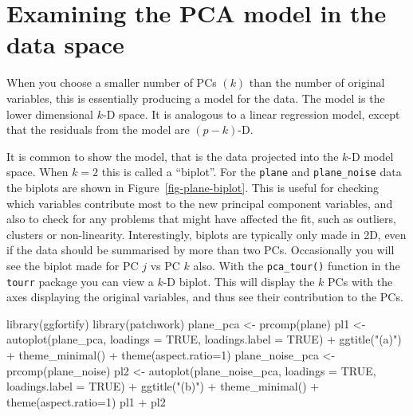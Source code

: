\documentclass[
  letterpaper,
]{krantz}
\newenvironment{Shaded}{\begin{snugshade}}{\end{snugshade}}
\newcommand{\AttributeTok}[1]{\textcolor[rgb]{0.40,0.45,0.13}{#1}}
\newcommand{\ConstantTok}[1]{\textcolor[rgb]{0.56,0.35,0.01}{#1}}
\newcommand{\DecValTok}[1]{\textcolor[rgb]{0.68,0.00,0.00}{#1}}
\newcommand{\FunctionTok}[1]{\textcolor[rgb]{0.28,0.35,0.67}{#1}}
\newcommand{\NormalTok}[1]{\textcolor[rgb]{0.00,0.23,0.31}{#1}}
\newcommand{\OtherTok}[1]{\textcolor[rgb]{0.00,0.23,0.31}{#1}}
\newcommand{\SpecialCharTok}[1]{\textcolor[rgb]{0.37,0.37,0.37}{#1}}
\newcommand{\StringTok}[1]{\textcolor[rgb]{0.13,0.47,0.30}{#1}}
\begin{document}
\hypertarget{examining-the-pca-model-in-the-data-space}{%
\section{Examining the PCA model in the data
space}\label{examining-the-pca-model-in-the-data-space}}

When you choose a smaller number of PCs \((k)\) than the number of
original variables, this is essentially producing a model for the data.
The model is the lower dimensional \(k\)-D space. It is analogous to a
linear regression model, except that the residuals from the model are
\((p-k)\)-D.

It is common to show the model, that is the data projected into the
\(k\)-D model space. When \(k=2\) this is called a ``biplot''. For the
\texttt{plane} and \texttt{plane\_noise} data the biplots are shown in
Figure~\ref{fig-plane-biplot}. This is useful for checking which
variables contribute most to the new principal component variables, and
also to check for any problems that might have affected the fit, such as
outliers, clusters or non-linearity. Interestingly, biplots are
typically only made in 2D, even if the data should be summarised by more
than two PCs. Occasionally you will see the biplot made for PC \(j\) vs
PC \(k\) also. With the \texttt{pca\_tour()} function in the
\texttt{tourr} package you can view a \(k\)-D biplot. This will display
the \(k\) PCs with the axes displaying the original variables, and thus
see their contribution to the PCs.

\begin{Shaded}
\begin{Highlighting}[]
\FunctionTok{library}\NormalTok{(ggfortify)}
\FunctionTok{library}\NormalTok{(patchwork)}
\NormalTok{plane\_pca }\OtherTok{\textless{}{-}} \FunctionTok{prcomp}\NormalTok{(plane)}
\NormalTok{pl1 }\OtherTok{\textless{}{-}} \FunctionTok{autoplot}\NormalTok{(plane\_pca, }\AttributeTok{loadings =} \ConstantTok{TRUE}\NormalTok{, }
         \AttributeTok{loadings.label =} \ConstantTok{TRUE}\NormalTok{) }\SpecialCharTok{+} 
  \FunctionTok{ggtitle}\NormalTok{(}\StringTok{"(a)"}\NormalTok{) }\SpecialCharTok{+}
  \FunctionTok{theme\_minimal}\NormalTok{() }\SpecialCharTok{+} 
  \FunctionTok{theme}\NormalTok{(}\AttributeTok{aspect.ratio=}\DecValTok{1}\NormalTok{)}
\NormalTok{plane\_noise\_pca }\OtherTok{\textless{}{-}} \FunctionTok{prcomp}\NormalTok{(plane\_noise)}
\NormalTok{pl2 }\OtherTok{\textless{}{-}} \FunctionTok{autoplot}\NormalTok{(plane\_noise\_pca, }\AttributeTok{loadings =} \ConstantTok{TRUE}\NormalTok{, }
         \AttributeTok{loadings.label =} \ConstantTok{TRUE}\NormalTok{) }\SpecialCharTok{+} 
  \FunctionTok{ggtitle}\NormalTok{(}\StringTok{"(b)"}\NormalTok{) }\SpecialCharTok{+}
  \FunctionTok{theme\_minimal}\NormalTok{() }\SpecialCharTok{+} 
  \FunctionTok{theme}\NormalTok{(}\AttributeTok{aspect.ratio=}\DecValTok{1}\NormalTok{)}
\NormalTok{pl1 }\SpecialCharTok{+}\NormalTok{ pl2}
\end{Highlighting}
\end{Shaded}
\end{document}
